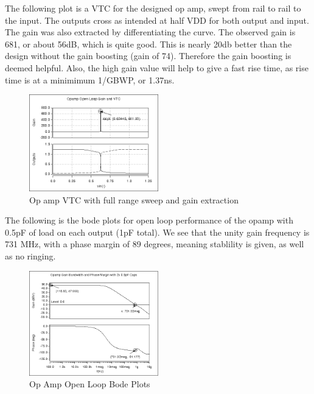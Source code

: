 \documentclass[conference]{IEEEtran}
\begin{document}
The following plot is a VTC for the designed op amp, swept from rail to rail to the input. The outputs cross as intended at half VDD for both output and input. The gain was also extracted by differentiating the curve. The observed gain is 681, or about 56dB, which is quite good. This is nearly 20db better than the design without the gain boosting (gain of 74). Therefore the gain boosting is deemed helpful. Also, the high gain value will help to give a fast rise time, as rise time is at a minimimum 1/GBWP, or 1.37ns.
\FloatBarrier
\begin{figure}[htb]
\centering
\includegraphics[width=0.5\textwidth]{full_gain_grid.png}
\caption{Op amp VTC with full range sweep and gain extraction}
\label{folded}
\end{figure}
\FloatBarrier
The following is the bode plots for open loop performance of the opamp with 0.5pF of load on each output (1pF total). We see that the unity gain frequency is 731 MHz, with a phase margin of 89 degrees, meaning stablility is given, as well as no ringing.
\FloatBarrier
\begin{figure}[htb]
\centering
\includegraphics[width=0.5\textwidth]{gbw_pm.png}
\caption{Op Amp Open Loop Bode Plots}
\label{folded}
\end{figure}
\FloatBarrier



\pagebreak
\end{document}
